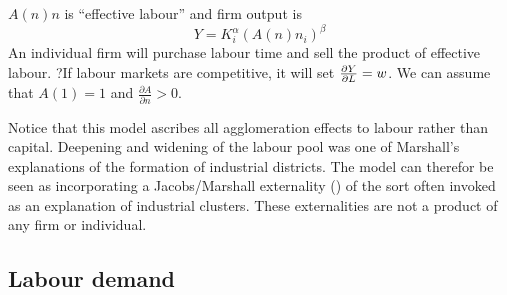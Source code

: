   $A(n)n$ is  ``effective labour'' and 
firm output is 
\begin{equation} 
Y=K_i^{\alpha }(A(n)n_i)^{\beta }
\label{eqn-solow-swan2}
\end{equation}
An individual firm will purchase labour time  and sell the product of effective labour. 
?If labour markets are competitive, it will set $\frac{\partial Y}{\partial L}=w$.
We can assume  that $A(1)=1$ and $\frac{\partial A}{\partial n}>0$. 

Notice that this model ascribes all agglomeration effects to labour rather than capital. Deepening  and widening of the labour pool was one of Marshall's explanations of the formation of industrial districts. The model can therefor  be seen as incorporating a Jacobs/Marshall externality (\cite{beaudryWhoRightMarshall2009, vanderpanneAgglomerationExternalitiesMarshall2004}) of the sort often invoked as an explanation of industrial clusters. These externalities  are not a product of any firm or individual. 









\subsection{Labour demand} \label{section-labour-demand}


